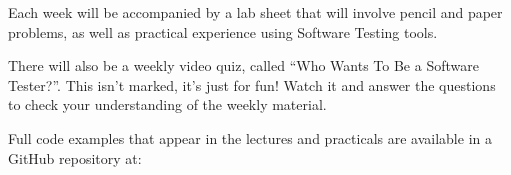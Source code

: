 Each week will be accompanied by a lab sheet that will involve pencil and paper
problems, as well as practical experience using Software Testing tools.

There will also be a weekly video quiz, called ``Who Wants To Be a Software
Tester?''. This isn't marked, it's just for fun! Watch it and answer the
questions to check your understanding of the weekly material.


Full code examples that appear in the lectures and practicals are available in a
GitHub repository at:

\centredexamplesrepourl

